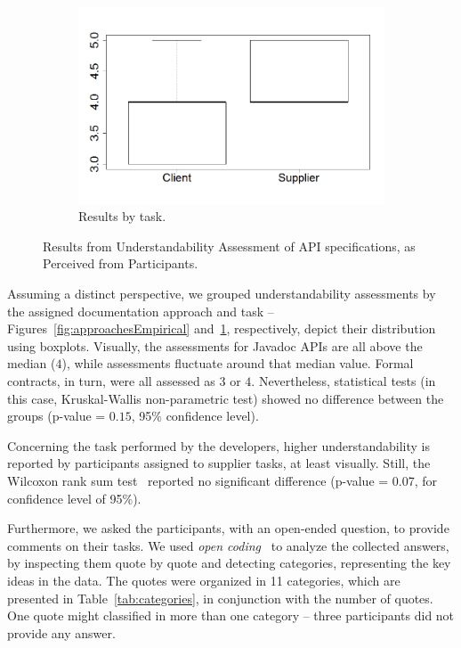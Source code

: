 \begin{figure}
\begin{subfigure}{.33\textwidth}
\includegraphics[width=1\linewidth]{figs/boxplotTasksEmpiricalStudy}
\caption{Results by task.}
\label{fig:tasksEmpirical}
\end{subfigure}
\caption{Results from Understandability Assessment of API specifications, as Perceived from Participants.}
\label{fig:empiricalResults}
\end{figure}

Assuming a distinct perspective, we grouped understandability assessments by the assigned documentation approach and task -- Figures~\ref{fig:approachesEmpirical} and~\ref{fig:tasksEmpirical}, respectively, depict their distribution using boxplots.
Visually, the assessments for Javadoc APIs are all above the median ($4$), while \contractjdoc{} assessments fluctuate around that median value. Formal contracts, in turn, were all assessed as $3$ or $4$.  
Nevertheless, statistical tests (in this case, Kruskal-Wallis non-parametric test) showed no difference between the groups (p-value = $0.15$, 95\% confidence level).

Concerning the task performed by the developers, higher understandability is reported by participants assigned to supplier tasks, at least visually. Still, the Wilcoxon rank sum test~\cite{statistical} reported no significant difference (p-value = 0.07, for confidence level of 95\%).

Furthermore, we asked the participants, with an open-ended question, to provide comments on their tasks. 
We used \emph{open coding}~\cite{openCoding} to analyze the collected answers, by inspecting them quote by quote and detecting categories, representing the key ideas in the data.
The quotes were organized in 11 categories, which are presented in Table~\ref{tab:categories}, in conjunction with the number of quotes. One quote might classified in more than one category -- three participants did not provide any answer.

